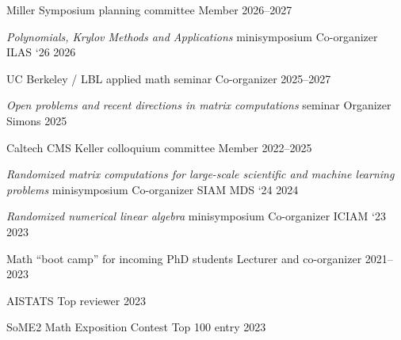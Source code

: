 

\begin{cvhonors}
    \cvhonor
    {Miller Symposium planning committee} %
    {Member} %
    {} %
    {2026--2027} %

    \cvhonor
    {\emph{Polynomials, Krylov Methods and Applications} minisymposium} %
    {Co-organizer} %
    {ILAS `26} %
    {2026} %

    \cvhonor
    {UC Berkeley / LBL applied math seminar} %
    {Co-organizer} %
    {} %
    {2025--2027} %

    \cvhonor
    {\emph{Open problems and recent directions in matrix computations} seminar} %
    {Organizer} %
    {Simons} %
    {2025} %
    
    \cvhonor
    {Caltech CMS Keller colloquium committee} %
    {Member} %
    {} %
    {2022--2025} %

    \cvhonor
    {\emph{Randomized matrix computations for large-scale scientific and machine learning problems} minisymposium} %
    {Co-organizer} %
    {SIAM MDS `24} %
    {2024} %

    \cvhonor
    {\emph{Randomized numerical linear algebra} minisymposium} %
    {Co-organizer} %
    {ICIAM `23} %
    {2023} %
    
\end{cvhonors}

\begin{cvhonors}
  \cvhonor
    {Math ``boot camp'' for incoming PhD students} %
    {Lecturer and co-organizer} %
    {} %
    {2021--2023} %

  \cvhonor
    {AISTATS} %
    {Top reviewer} %
    {} %
    {2023} %
    
  \cvhonor
    {SoME2 Math Exposition Contest} %
    {Top 100 entry} %
    {} %
    {2023} %
    
\end{cvhonors}


